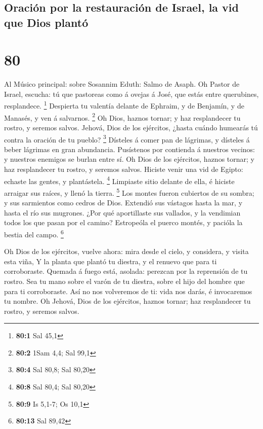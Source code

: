 \hypertarget{oraciuxf3n-por-la-restauraciuxf3n-de-israel-la-vid-que-dios-plantuxf3}{%
\subsection{Oración por la restauración de Israel, la vid que Dios
plantó}\label{oraciuxf3n-por-la-restauraciuxf3n-de-israel-la-vid-que-dios-plantuxf3}}

\hypertarget{section-79}{%
\section{80}\label{section-79}}

 Al Músico principal: sobre Sosannim Eduth: Salmo de Asaph.
Oh Pastor de Israel, escucha: tú que pastoreas como á ovejas á José, que
estás entre querubines, resplandece. \footnote{\textbf{80:1} Sal 45,1}
 Despierta tu valentía delante de Ephraim, y de Benjamín, y
de Manasés, y ven á salvarnos. \footnote{\textbf{80:2} 1Sam 4,4; Sal
  99,1}  Oh Dios, haznos tornar; y haz resplandecer tu
rostro, y seremos salvos.  Jehová, Dios de los ejércitos,
¿hasta cuándo humearás tú contra la oración de tu pueblo? \footnote{\textbf{80:4}
  Sal 80,8; Sal 80,20}  Dísteles á comer pan de lágrimas, y
dísteles á beber lágrimas en gran abundancia.  Pusístenos
por contienda á nuestros vecinos: y nuestros enemigos se burlan entre
sí.  Oh Dios de los ejércitos, haznos tornar; y haz
resplandecer tu rostro, y seremos salvos.  Hiciste venir una
vid de Egipto: echaste las gentes, y plantástela. \footnote{\textbf{80:8}
  Sal 80,4; Sal 80,20}  Limpiaste sitio delante de ella, é
hiciste arraigar sus raíces, y llenó la tierra. \footnote{\textbf{80:9}
  Is 5,1-7; Os 10,1}  Los montes fueron cubiertos de su
sombra; y sus sarmientos como cedros de Dios.  Extendió sus
vástagos hasta la mar, y hasta el río sus mugrones.  ¿Por
qué aportillaste sus vallados, y la vendimian todos los que pasan por el
camino?  Estropeóla el puerco montés, y pacióla la bestia
del campo. \footnote{\textbf{80:13} Sal 89,42}

 Oh Dios de los ejércitos, vuelve ahora: mira desde el
cielo, y considera, y visita esta viña,  Y la planta que
plantó tu diestra, y el renuevo que para ti corroboraste. 
Quemada á fuego está, asolada: perezcan por la reprensión de tu rostro.
 Sea tu mano sobre el varón de tu diestra, sobre el hijo
del hombre que para ti corroboraste.  Así no nos volveremos
de ti: vida nos darás, é invocaremos tu nombre.  Oh Jehová,
Dios de los ejércitos, haznos tornar; haz resplandecer tu rostro, y
seremos salvos.

